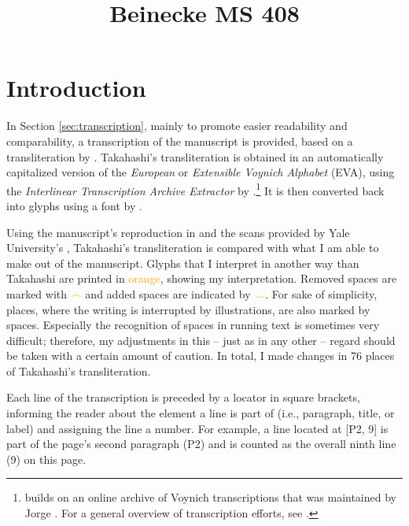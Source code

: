 \documentclass{scrarticle}
\title{Beinecke MS 408}
\date{}
\begin{document}
\maketitle


\section{Introduction}\label{sec:introduction}
In Section \ref{sec:transcription}, mainly to promote easier readability and comparability, a transcription of the manuscript is provided, based on a transliteration by \citet{takahashi_voynich_2004}.
Takahashi's transliteration is obtained in an automatically capitalized version of the \textit{European} or \textit{Extensible Voynich Alphabet} (EVA), using the \textit{Interlinear Transcription Archive Extractor} by \citet{schwerdtfeger_voynich_2004}.\footnote{\citet{schwerdtfeger_voynich_2004} builds on an online archive of Voynich transcriptions that was maintained by Jorge \citet{stolfi_voynich_1998}. For a general overview of transcription efforts, see \citet{zandbergen_text_2023}.}
It is then converted back into glyphs using a font by \citet{bettencourt_voynich_2019}.

Using the manuscript's reproduction in \citet{clemens_voynich_2016} and the scans provided by  Yale University's \citet{beinecke_voynich_2004}, Takahashi's transliteration is compared with what I am able to make out of the manuscript.
Glyphs that I interpret in another way than Takahashi are printed in \textcolor{orange}{orange}, showing my interpretation.
Removed spaces are marked with \textcolor{orange}{$\frown$} and added spaces are indicated by \textcolor{orange}{$\smile$}.
For sake of simplicity, places, where the writing is interrupted by illustrations, are also marked by spaces.
Especially the recognition of spaces in running text is sometimes very difficult; therefore, my adjustments in this -- just as in any other -- regard should be taken with a certain amount of caution.
In total, I made changes in 76 places of Takahashi's transliteration.

Each line of the transcription is preceded by a locator in square brackets, informing the reader about the element a line is part of (i.e., paragraph, title, or label) and assigning the line a number.
For example, a line located at [P2, 9] is part of the page's second paragraph (P2) and is counted as the overall ninth line (9) on this page.


\clearpage
\end{document}

